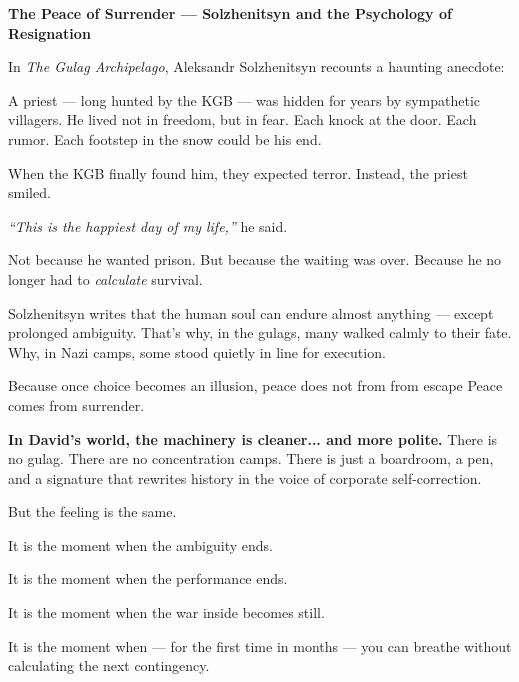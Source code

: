 \begin{HistoricalSidebar}{\textbf{The Peace of Surrender --- Solzhenitsyn and the Psychology of Resignation}}

    In \textit{The Gulag Archipelago}, Aleksandr Solzhenitsyn recounts a haunting anecdote:  

    \medskip
    
    A priest — long hunted by the KGB — was hidden for years by sympathetic villagers. He lived 
    not in freedom, but in fear.  
    Each knock at the door. Each rumor. Each footstep in the snow could be his end.  

    \medskip
    
    When the KGB finally found him, they expected terror.  
    Instead, the priest smiled.

    \medskip
    
    \textit{“This is the happiest day of my life,”} he said.

    \medskip
    
    Not because he wanted prison.  
    But because the waiting was over.  
    Because he no longer had to \textit{calculate} survival.  

    \medskip
    
    Solzhenitsyn writes that the human soul can endure almost anything --- 
    except prolonged ambiguity.  
    That’s why, in the gulags, many walked calmly to their fate.  
    Why, in Nazi camps, some stood quietly in line for execution.

    \medskip
    
    Because once choice becomes an illusion, peace does not from from escape 
    Peace comes from surrender.
    
    \medskip
    
    \textbf{In David’s world, the machinery is cleaner... and more polite.}  
    There is no gulag. There are no concentration camps.  
    There is just a boardroom, a pen, and a signature that rewrites history in the voice of corporate 
    self-correction.

    \medskip
    
    But the feeling is the same.

    \medskip
    
    It is the moment when the ambiguity ends.  

    It is the moment when the performance ends.  

    It is the moment when the war inside becomes still.

    \medskip
    
    It is the moment when --- for the first time in months ---
    you can breathe without calculating the next contingency.
    
\end{HistoricalSidebar}
    